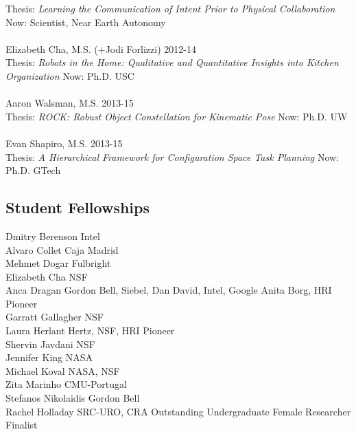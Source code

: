 Thesis: \textit{Learning the Communication of Intent Prior to Physical Collaboration} \hfill Now: Scientist, Near Earth Autonomy\\
\\
Elizabeth Cha, M.S. (+Jodi Forlizzi)  \hfill 2012-14\\
Thesis: \textit{Robots in the Home: Qualitative and Quantitative Insights into Kitchen Organization} \hfill Now: Ph.D. USC\\
\\
Aaron Walsman, M.S.  \hfill 2013-15\\
Thesis: \textit{ROCK: Robust Object Constellation for Kinematic Pose} \hfill Now: Ph.D. UW\\
\\
Evan Shapiro, M.S.  \hfill 2013-15\\
Thesis: \textit{A Hierarchical Framework for Configuration Space Task Planning} \hfill Now: Ph.D. GTech\\

\subsection{Student Fellowships}
\noindent
Dmitry Berenson \hfill Intel\\
Alvaro Collet \hfill Caja Madrid\\
Mehmet Dogar \hfill Fulbright\\
Elizabeth Cha \hfill NSF\\
Anca Dragan \hfill Gordon Bell, Siebel, Dan David, Intel, Google Anita Borg, HRI Pioneer\\
Garratt Gallagher \hfill NSF\\
Laura Herlant \hfill Hertz, NSF, HRI Pioneer\\
Shervin Javdani \hfill NSF\\
Jennifer King \hfill NASA\\
Michael Koval \hfill NASA, NSF\\
Zita Marinho \hfill CMU-Portugal\\
Stefanos Nikolaidis \hfill Gordon Bell\\
Rachel Holladay \hfill SRC-URO, CRA Outstanding Undergraduate Female Researcher Finalist\\


